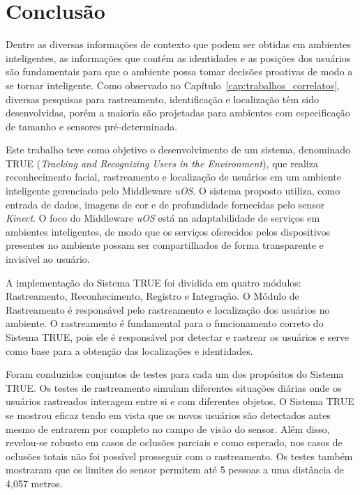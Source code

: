 \chapter{Conclusão}
\label{cap:conclusao}

Dentre as diversas informações de contexto que podem ser obtidas em ambientes
inteligentes, as informações que contém as identidades e as posições dos
usuários são fundamentais para que o ambiente possa tomar decisões proativas de modo a se tornar inteligente. Como observado no Capítulo~\ref{cap:trabalhos_correlatos}, diversas pesquisas para rastreamento, identificação e localização têm sido desenvolvidas, porém a maioria são projetadas para ambientes com especificação de tamanho e sensores pré-determinada.

Este trabalho teve como objetivo o desenvolvimento de um sistema, denominado TRUE (\textit{Tracking and Recognizing Users in the Environment}), que realiza reconhecimento facial, rastreamento e localização de usuários em um ambiente inteligente gerenciado pelo Middleware \textit{uOS}. O sistema proposto utiliza, como entrada de dados, imagens de cor e de profundidade fornecidas pelo sensor \textit{Kinect}. O foco do Middleware \textit{uOS} está na adaptabilidade de serviços em ambientes inteligentes, de modo que os serviços oferecidos pelos dispositivos presentes no ambiente possam ser compartilhados de forma transparente e invisível ao usuário.

A implementação do Sistema TRUE foi dividida em  quatro módulos: Rastreamento, Reconhecimento, Registro e Integração. O Módulo de Rastreamento é responsável pelo rastreamento e localização dos usuários no ambiente. O rastreamento é fundamental para o funcionamento correto do Sistema TRUE, pois ele é responsável por detectar e rastrear os usuários e serve como base para a obtenção das localizações e identidades. 

Foram conduzidos conjuntos de testes para cada um dos propósitos do Sistema TRUE. Os testes de rastreamento simulam diferentes situações diárias onde os usuários rastreados interagem entre si e com diferentes objetos. O Sistema TRUE se mostrou eficaz tendo em vista que os novos usuários são detectados antes mesmo de entrarem por completo no campo de visão do sensor. Além disso, revelou-se robusto em casos de oclusões parciais e como esperado, nos casos de oclusões totais não foi possível prosseguir com o rastreamento. Os testes também mostraram que os limites do sensor permitem até 5 pessoas a uma distância de 4,057 metros.

